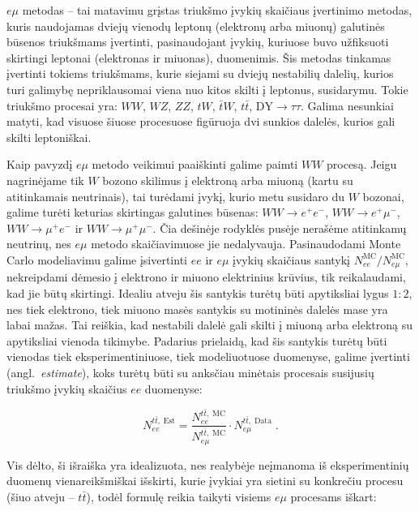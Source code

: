 \documentclass[a4paper, 12pt]{article}
\newcommand{\WW}{W\! W}
\newcommand{\ZZ}{Z\! Z}
\newcommand{\WZ}{W\! Z}
\newcommand{\tbarW}{\bar{t}W}
\newcommand{\ttbar}{t\bar{t}}
\newcommand{\emu}{e\mu}
\newcommand{\DYtau}{\mathrm{DY} \! \rightarrow \! \tau\tau}
\newlength\q
\begin{document}
$\emu$ metodas -- tai matavimu grįstas triukšmo įvykių skaičiaus įvertinimo metodas, kuris
naudojamas dviejų vienodų leptonų (elektronų arba miuonų) galutinės būsenos triukšmams
įvertinti, pasinaudojant įvykių, kuriuose buvo užfiksuoti skirtingi leptonai (elektronas
ir miuonas), duomenimis.
Šis metodas tinkamas įvertinti tokiems triukšmams, kurie siejami su dviejų nestabilių
dalelių, kurios turi galimybę nepriklausomai viena nuo kitos skilti į leptonus, susidarymu.
Tokie triukšmo procesai yra: $\WW$, $\WZ$, $\ZZ$, $tW$, $\tbarW$, $\ttbar$, $\DYtau$.
Galima nesunkiai matyti, kad visuose šiuose procesuose figūruoja dvi sunkios dalelės, kurios
gali skilti leptoniškai.

Kaip pavyzdį $\emu$ metodo veikimui paaiškinti galime paimti $WW$ procesą.
Jeigu nagrinėjame tik $W$ bozono skilimus į elektroną arba miuoną (kartu su atitinkamais
neutrinais), tai turėdami įvykį, kurio metu susidaro du $W$ bozonai, galime turėti
keturias skirtingas galutines būsenas: $WW \! \rightarrow \! e^+e^-$,
$WW \! \rightarrow \! e^+\mu^-$, $WW \! \rightarrow \! \mu^+e^-$ ir
$WW \! \rightarrow \! \mu^+\mu^-$.
Čia dešinėje rodyklės pusėje nerašėme atitinkamų neutrinų, nes $\emu$ metodo skaičiavimuose
jie nedalyvauja.
Pasinaudodami Monte Carlo modeliavimu galime įsivertinti $ee$ ir $\emu$ įvykių skaičiaus
santykį $N_{ee}^{\mathrm{MC}} / N_{\emu}^{\mathrm{MC}}$, nekreipdami dėmesio į elektrono
ir miuono elektrinius krūvius, tik reikalaudami, kad jie būtų skirtingi.
Idealiu atveju šis santykis turėtų būti apytiksliai lygus $1:2$, nes tiek elektrono, tiek
miuono masės santykis su motininės dalelės mase yra labai mažas.
Tai reiškia, kad nestabili dalelė gali skilti į miuoną arba elektroną su apytiksliai
vienoda tikimybe.
Padarius prielaidą, kad šis santykis turėtų būti vienodas tiek eksperimentiniuose, tiek
modeliuotuose duomenyse, galime įvertinti (angl.\ \textit{estimate}), koks turėtų būti su
anksčiau minėtais procesais susijusių triukšmo įvykių skaičius $ee$ duomenyse:

\begin{equation}
	N_{ee}^{t\bar{t} , \; \mathrm{Est}} =
	\frac{ N_{ee}^{t\bar{t} , \; \mathrm{MC}} }{ N_{e\mu}^{t\bar{t} , \; \mathrm{MC}} }
	\cdot N_{e\mu}^{t\bar{t} , \; \mathrm{Data}} \; .
	\label{eq:emuMethod}
\end{equation}

Vis dėlto, ši išraiška yra idealizuota, nes realybėje neįmanoma iš eksperimentinių duomenų
vienareikšmiškai išskirti, kurie įvykiai yra sietini su konkrečiu procesu (šiuo atveju --
$\ttbar$), todėl formulę reikia taikyti visiems $\emu$ procesams iškart:
\end{document}
